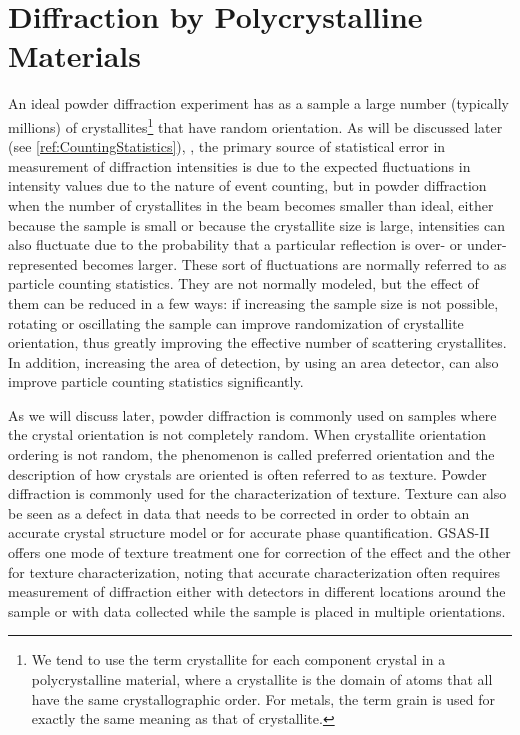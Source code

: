 \section{Diffraction by Polycrystalline Materials}
An ideal powder diffraction experiment has as a sample a large number (typically millions) of crystallites\footnote{We tend to use the term crystallite for each component crystal in a polycrystalline material, where a crystallite is the domain of atoms that all have the same crystallographic order. For metals, the term grain is used for exactly the same meaning as that of crystallite.}
that have random orientation. As will be discussed later (see \ref{ref:CountingStatistics}), , the primary source of statistical error in measurement of diffraction intensities is due to the expected fluctuations in intensity values due to the nature of event counting, but in powder diffraction when the number of crystallites in the beam becomes smaller than ideal, either because the sample is small or because the crystallite size is large, intensities can also fluctuate due to the probability that a particular reflection is over- or under-represented becomes larger. These sort of fluctuations are normally referred to as particle counting statistics. They are not normally modeled, but the effect of them can be reduced in a few ways: if increasing the sample size is not possible, rotating or oscillating the sample can improve randomization of crystallite orientation, thus greatly improving the effective number of scattering crystallites. In addition, increasing the area of detection, by using an area detector, can also improve particle counting statistics significantly. 

As we will discuss later, powder diffraction is commonly used on samples where the crystal orientation is not completely random. When crystallite orientation ordering is not random, the phenomenon is called preferred orientation and the description of how crystals are oriented is often referred to as texture. 
Powder diffraction is commonly used for the characterization of texture. Texture can also be seen as a defect in data that needs to be corrected in order to obtain an accurate crystal structure model or for accurate phase quantification. GSAS-II offers one mode of texture treatment one for correction of the effect and the other for texture characterization, noting that accurate characterization often requires measurement of diffraction either with detectors in different locations around the sample or with data collected while the sample is placed in multiple orientations. 

